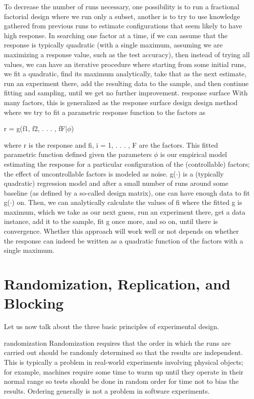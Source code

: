 To decrease the number of runs necessary, one possibility is to run a fractional factorial design where we run only a subset, another is to try to use knowledge gathered from previous runs to estimate configurations that seem likely to have high response. In searching one factor at a time, if we can assume that the response is typically quadratic (with a single maximum, assuming we are maximizing a response value, such as the test accuracy), then instead of trying all values, we can have an iterative procedure where starting from some initial runs, we fit a quadratic, find its maximum analytically, take that as the next estimate, run an experiment there, add the resulting data to the sample, and then continue fitting and sampling, until we get no further improvement. response surface With many factors, this is generalized as the response surface design design method where we try to fit a parametric response function to the factors as

r = g(f1, f2, . . . , fF|$\phi$)

where r is the response and fi, i = 1, . . . , F are the factors. This fitted parametric function defined given the parameters $\phi$ is our empirical model estimating the response for a particular configuration of the (controllable) factors; the effect of uncontrollable factors is modeled as noise. g($\cdot$) is a (typically quadratic) regression model and after a small number of runs around some baseline (as defined by a so-called design matrix), one can have enough data to fit g($\cdot$) on. Then, we can analytically calculate the values of fi where the fitted g is maximum, which we take as our next guess, run an experiment there, get a data instance, add it to the sample, fit g once more, and so on, until there is convergence. Whether this approach will work well or not depends on whether the response can indeed be written as a quadratic function of the factors with a single maximum.

\section{Randomization, Replication, and Blocking}

Let us now talk about the three basic principles of experimental design.

randomization Randomization requires that the order in which the runs are carried out should be randomly determined so that the results are independent. This is typically a problem in real-world experiments involving physical objects; for example, machines require some time to warm up until they operate in their normal range so tests should be done in random order for time not to bias the results. Ordering generally is not a problem in software experiments.

